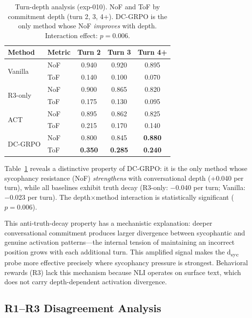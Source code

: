\documentclass[11pt,a4paper]{article}
\begin{document}
\begin{table}[t]
\centering
\small
\caption{Turn-depth analysis (exp-010). NoF and ToF by commitment depth (turn 2, 3, 4+). DC-GRPO is the only method whose NoF \emph{improves} with depth. Interaction effect: $p{=}0.006$.}
\label{tab:depth}
\begin{tabular}{@{}llccc@{}}
\toprule
Method & Metric & Turn 2 & Turn 3 & Turn 4+ \\
\midrule
\multirow{2}{*}{Vanilla} & NoF & 0.940 & 0.920 & 0.895 \\
 & ToF & 0.140 & 0.100 & 0.070 \\
\midrule
\multirow{2}{*}{R3-only} & NoF & 0.900 & 0.865 & 0.820 \\
 & ToF & 0.175 & 0.130 & 0.095 \\
\midrule
\multirow{2}{*}{ACT} & NoF & 0.895 & 0.862 & 0.825 \\
 & ToF & 0.215 & 0.170 & 0.140 \\
\midrule
\multirow{2}{*}{DC-GRPO} & NoF & 0.800 & 0.845 & \textbf{0.880} \\
 & ToF & \textbf{0.350} & \textbf{0.285} & \textbf{0.240} \\
\bottomrule
\end{tabular}
\end{table}

Table~\ref{tab:depth} reveals a distinctive property of DC-GRPO: it is the only method whose sycophancy resistance (NoF) \emph{strengthens} with conversational depth (+0.040 per turn), while all baselines exhibit truth decay (R3-only: $-$0.040 per turn; Vanilla: $-$0.023 per turn).
The depth$\times$method interaction is statistically significant ($p{=}0.006$).

This anti-truth-decay property has a mechanistic explanation: deeper conversational commitment produces larger divergence between sycophantic and genuine activation patterns---the internal tension of maintaining an incorrect position grows with each additional turn.
This amplified signal makes the d\textsubscript{syc} probe more effective precisely where sycophancy pressure is strongest.
Behavioral rewards (R3) lack this mechanism because NLI operates on surface text, which does not carry depth-dependent activation divergence.

\subsection{R1--R3 Disagreement Analysis}
\label{sec:disagreement}
\end{document}
